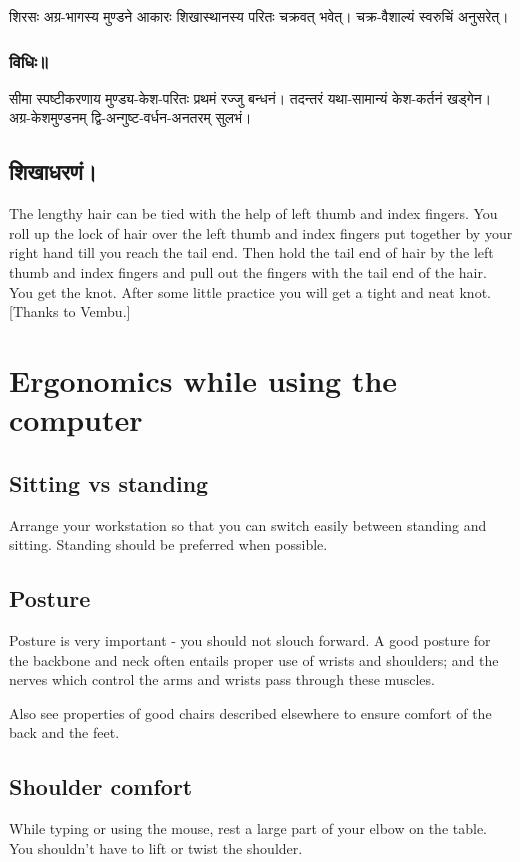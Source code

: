 \documentclass[oneside, article]{memoir}
\begin{document}
शिरसः अग्र-भागस्य मुण्डने आकारः शिखास्थानस्य परितः चक्रवत् भवेत्। चक्र-वैशाल्यं स्वरुचिं अनुसरेत्।

\subsection{विधिः॥}
सीमा स्पष्टीकरणाय मुण्ड्य-केश-परितः प्रथमं रज्जु बन्धनं। तदन्तरं यथा-सामान्यं केश-कर्तनं खड्गेन।
अग्र-केशमुण्डनम् द्वि-अन्गुष्ट-वर्धन-अनतरम् सुलभं।

\section{शिखाधरणं।}


The lengthy hair can be tied with the help of left thumb and index fingers. You roll up the lock of hair over the left thumb and index fingers put together by your right hand till you reach the tail end. Then hold the tail end of hair by the left thumb and index fingers and pull out the fingers with the tail end of the hair. You get the knot. After some little practice you will get a tight and neat knot. [Thanks to Vembu.]

\chapter{Ergonomics while using the computer}
\section{Sitting vs standing}
Arrange your workstation so that you can switch easily between standing and sitting. Standing should be preferred when possible.

\section{Posture}
Posture is very important - you should not slouch forward. A good posture for the backbone and neck often entails proper use of wrists and shoulders; and the nerves which control the arms and wrists pass through these muscles.

Also see properties of good chairs described elsewhere to ensure comfort of the back and the feet.

\section{Shoulder comfort}
While typing or using the mouse, rest a large part of your elbow on the table. You shouldn't have to lift or twist the shoulder.
\end{document}
